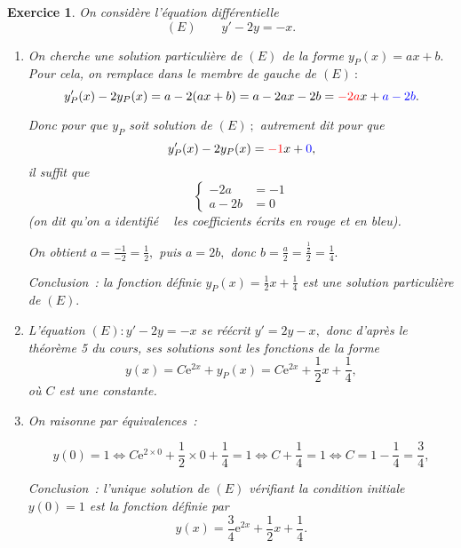 \documentclass[10pt]{article}
\newtheorem{exo}{Exercice}
\begin{document}
\begin{exo}

On considère l'équation différentielle
\[(E)\qquad y'-2y=-x.\]

\begin{enumerate}
\item On cherche une solution particulière de $(E)$ de la forme $y_P(x)=ax+b.$ Pour cela, on remplace dans le membre de gauche de $(E)~:$
\[y_P'(x)-2y_P(x)=a-2(ax+b)=a-2ax-2b=\textcolor{red}{-2a}x+\textcolor{blue}{a-2b}.\]

Donc pour que $y_P$ soit solution de $(E)~;$ autrement dit pour que \[y_P'(x)-2y_P(x)=\textcolor{red}{-1}x+\textcolor{blue}{0},\]
il suffit que
\[\begin{cases}
-2a&=-1\\a-2b&=0\end{cases}\] (on dit qu'on a \og identifié \fg~{} les coefficients écrits en rouge et en bleu).

On obtient $a=\frac{-1}{-2}=\frac{1}{2},$ puis $a=2b,$ donc $b=\frac{a}{2}=\frac{\frac{1}{2}}{2}=\frac{1}{4}.$

\medskip

Conclusion~: la fonction définie $y_P(x)=\frac{1}{2}x+\frac{1}{4}$ est une solution particulière de $(E).$ 
\item L'équation $\left(E\right): y'-2y=-x$ se réécrit $y'=2y-x,$ donc d'après le théorème 5 du cours, ses solutions sont les fonctions de la forme 
\[y(x)=C\text{e}^{2x}+y_P(x)=C\text{e}^{2x}+\frac{1}{2}x+\frac{1}{4},\] où $C$ est une constante.
\item On raisonne par équivalences~:

\[y(0)=1\iff C\text{e}^{2\times 0}+\frac{1}{2}\times 0+\frac{1}{4}=1\iff C+\frac{1}{4}=1\iff C=1-\frac{1}{4}=\frac{3}{4},\]


Conclusion~: l'unique solution de $(E)$ vérifiant la condition initiale $y(0)=1$ est la fonction définie par
\[y(x)=\frac{3}{4}\text{e}^{2x}+\frac{1}{2}x+\frac{1}{4}.\]
\end{enumerate}
\end{exo}
\end{document}
